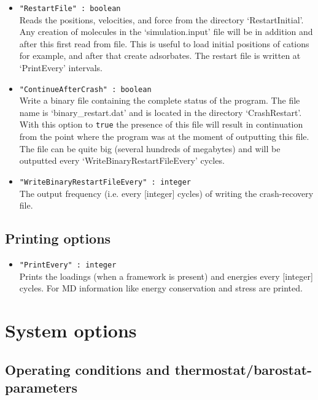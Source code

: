 \begin{itemize}
\item{\verb+"RestartFile" : boolean+}\\
Reads the positions, velocities, and force from the directory `RestartInitial'. Any creation of molecules
in the `simulation.input' file will be in addition and after this first read from file. This is useful to
load initial positions of cations for example, and after that create adsorbates. The restart file
is written at `PrintEvery' intervals.
\item{\verb+"ContinueAfterCrash" : boolean+}\\
Write a binary file containing the complete status of the program.
The file name is `binary\_restart.dat' and is located in the directory `CrashRestart'.
With this option to \verb+true+ the presence of this file will result in continuation from
the point where the program was at the moment of outputting this file.
The file can be quite big (several hundreds of megabytes) and will be outputted every
`WriteBinaryRestartFileEvery' cycles.
\item{\verb+"WriteBinaryRestartFileEvery" : integer+}\\
The output frequency (i.e. every [integer] cycles) of writing the crash-recovery file.
\end{itemize}

\subsection{Printing options}
\begin{itemize}
\item{\verb+"PrintEvery" : integer+}\\
Prints the loadings (when a framework is present) and energies every [integer] cycles. For MD information
like energy conservation and stress are printed.
\end{itemize}


\section{System options}

\subsection{Operating conditions and thermostat/barostat-parameters}

